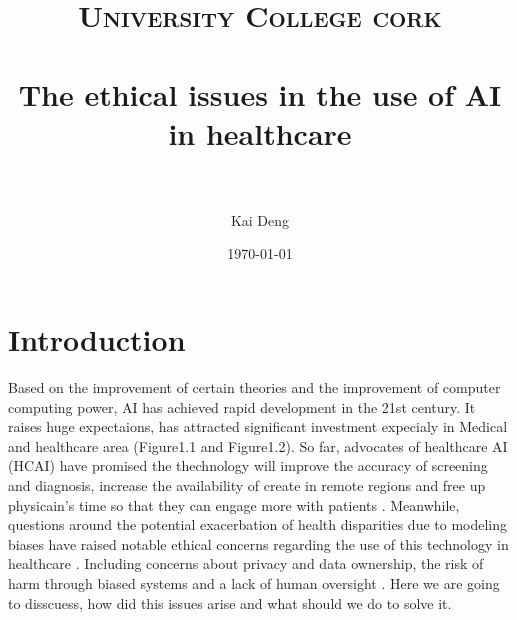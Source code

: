 \documentclass[paper=a4, fontsize=11pt]{scrartcl} %
\title{	
\normalfont \normalsize 
\textsc{University College cork} \\ [25pt] %
\horrule{0.5pt} \\[0.4cm] %
\huge The ethical issues in the use of AI in healthcare \\ %
\horrule{2pt} \\[0.5cm] %
}
\author{Kai Deng} %
\date{\normalsize\today} %
\numberwithin{equation}{section} %
\numberwithin{figure}{section} %
\numberwithin{table}{section} %
\begin{document}
\maketitle %


\section{Introduction}

Based on the improvement of certain theories and the improvement of computer computing power,
AI has achieved rapid development in the 21st century. It raises huge expectaions, has attracted 
significant investment expecialy in Medical and healthcare area (Figure1.1 and Figure1.2). So far, advocates of healthcare AI (HCAI)
have promised the thechnology will improve the accuracy of screening and diagnosis, increase the availability of create
in remote regions and free up physicain's time so that they can engage more with patients \cite{frostPublicViewsEthical2022}.
Meanwhile, questions around the potential exacerbation of health disparities due to modeling biases have raised notable ethical
concerns regarding the use of this technology in healthcare \cite{onianiAdoptingExpandingEthical2023}. Including concerns about privacy and 
data ownership, the risk of harm through biased systems and a lack of human oversight \cite{katiraiEthicsAdvancingArtificial2023}.
Here we are going to disscuess, how did this issues arise and what should we do to solve it.



\end{document}
